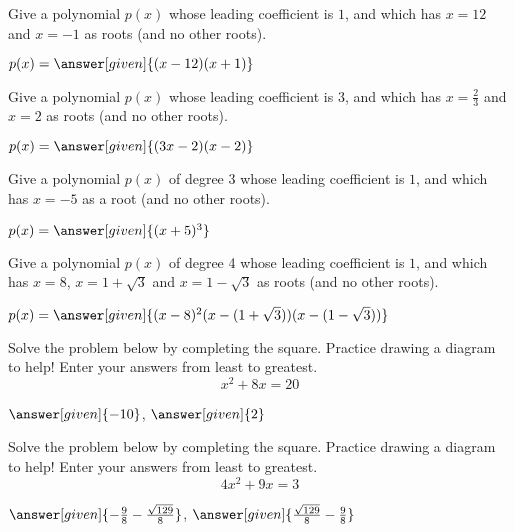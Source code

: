 \documentclass[nooutcomes]{ximera}
\begin{document}
\begin{problem}
Give a polynomial $p(x)$ whose leading coefficient is $1$, and which has $x=12$ and $x=-1$ as roots (and no other roots).

\begin{prompt}
	$p(x) = \answer[given]{(x-12)(x+1)}$
\end{prompt}
\end{problem}



\begin{problem}
Give a polynomial $p(x)$ whose leading coefficient is $3$, and which has $x=\frac{2}{3}$ and $x=2$ as roots (and no other roots).

\begin{prompt}
	$p(x) = \answer[given]{(3x-2)(x-2)}$
\end{prompt}
\end{problem}



\begin{problem}
Give a polynomial $p(x)$ of degree 3 whose leading coefficient is $1$, and which has $x=-5$ as a root (and no other roots).

\begin{prompt}
	$p(x) = \answer[given]{(x+5)^3}$
\end{prompt}
\end{problem}




\begin{problem}
Give a polynomial $p(x)$ of degree 4 whose leading coefficient is $1$, and which has $x=8$, $x=1+\sqrt{3}$ and $x = 1-\sqrt{3}$ as roots (and no other roots).

\begin{prompt}
	$p(x) = \answer[given]{(x-8)^2(x-(1+\sqrt{3}))(x-(1-\sqrt{3}))}$
\end{prompt}
\end{problem}



\begin{problem}
Solve the problem below by completing the square.  Practice drawing a diagram to help! Enter your answers from least to greatest.
\[
x^2 + 8x = 20
\]
\begin{prompt}
	$\answer[given]{-10}$, $\answer[given]{2}$
\end{prompt}
\end{problem}



\begin{problem}
Solve the problem below by completing the square.  Practice drawing a diagram to help! Enter your answers from least to greatest.
\[
4x^2 + 9x = 3
\]
\begin{prompt}
	$\answer[given]{-\frac{9}{8} - \frac{\sqrt{129}}{8}}$, $\answer[given]{\frac{\sqrt{129}}{8} - \frac{9}{8}}$
\end{prompt}
\end{problem}
\end{document}
